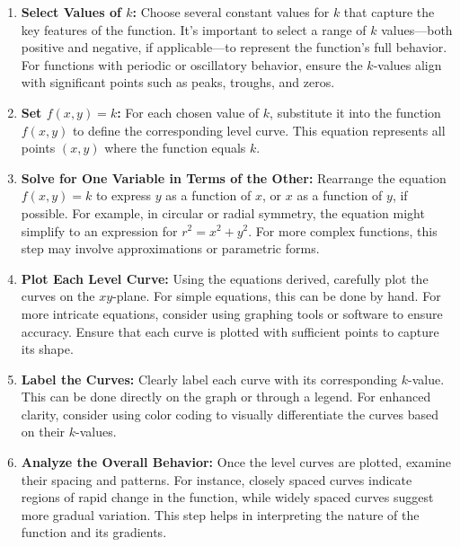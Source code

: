 \begin{enumerate}
    \item \textbf{Select Values of \( k \):} Choose several constant values for \( k \) that capture the key features of the function. It's important to select a range of \( k \) values—both positive and negative, if applicable—to represent the function's full behavior. For functions with periodic or oscillatory behavior, ensure the \( k \)-values align with significant points such as peaks, troughs, and zeros.

    \item \textbf{Set \( f(x, y) = k \):} For each chosen value of \( k \), substitute it into the function \( f(x, y) \) to define the corresponding level curve. This equation represents all points \( (x, y) \) where the function equals \( k \).

    \item \textbf{Solve for One Variable in Terms of the Other:} Rearrange the equation \( f(x, y) = k \) to express \( y \) as a function of \( x \), or \( x \) as a function of \( y \), if possible. For example, in circular or radial symmetry, the equation might simplify to an expression for \( r^2 = x^2 + y^2 \). For more complex functions, this step may involve approximations or parametric forms.

    \item \textbf{Plot Each Level Curve:} Using the equations derived, carefully plot the curves on the \( xy \)-plane. For simple equations, this can be done by hand. For more intricate equations, consider using graphing tools or software to ensure accuracy. Ensure that each curve is plotted with sufficient points to capture its shape.

    \item \textbf{Label the Curves:} Clearly label each curve with its corresponding \( k \)-value. This can be done directly on the graph or through a legend. For enhanced clarity, consider using color coding to visually differentiate the curves based on their \( k \)-values.

    \item \textbf{Analyze the Overall Behavior:} Once the level curves are plotted, examine their spacing and patterns. For instance, closely spaced curves indicate regions of rapid change in the function, while widely spaced curves suggest more gradual variation. This step helps in interpreting the nature of the function and its gradients.
\end{enumerate}

